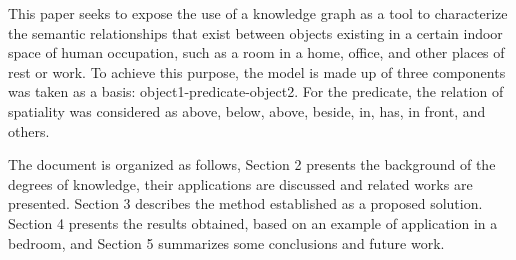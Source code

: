 This paper seeks to expose the use of a knowledge graph as a tool to characterize the semantic relationships that exist between objects existing in a certain indoor space of human occupation, such as a room in a home, office, and other places of rest or work. To achieve this purpose, the model is made up of three components was taken as a basis: object1-predicate-object2. For the predicate, the relation of spatiality was considered as above, below, above, beside, in, has, in front, and others.

The document is organized as follows, Section 2 presents the background of the degrees of knowledge, their applications are discussed and related works are presented. Section 3 describes the method established as a proposed solution. Section 4 presents the results obtained, based on an example of application in a bedroom, and Section 5 summarizes some conclusions and future work.
